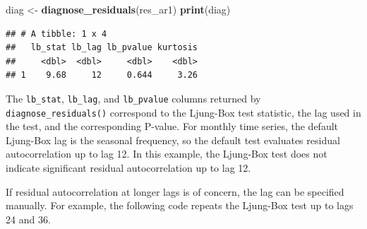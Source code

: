 \documentclass[
]{article}
\newenvironment{Shaded}{\begin{snugshade}}{\end{snugshade}}
\newcommand{\AttributeTok}[1]{\textcolor[rgb]{0.13,0.29,0.53}{#1}}
\newcommand{\DecValTok}[1]{\textcolor[rgb]{0.00,0.00,0.81}{#1}}
\newcommand{\FunctionTok}[1]{\textcolor[rgb]{0.13,0.29,0.53}{\textbf{#1}}}
\newcommand{\NormalTok}[1]{#1}
\newcommand{\OtherTok}[1]{\textcolor[rgb]{0.56,0.35,0.01}{#1}}
\newcommand{\SpecialCharTok}[1]{\textcolor[rgb]{0.81,0.36,0.00}{\textbf{#1}}}
\newcommand{\StringTok}[1]{\textcolor[rgb]{0.31,0.60,0.02}{#1}}
\begin{document}
\begin{Shaded}
\begin{Highlighting}[]
\NormalTok{diag }\OtherTok{\textless{}{-}} \FunctionTok{diagnose\_residuals}\NormalTok{(res\_ar1)}
\FunctionTok{print}\NormalTok{(diag)}
\end{Highlighting}
\end{Shaded}

\begin{verbatim}
## # A tibble: 1 x 4
##   lb_stat lb_lag lb_pvalue kurtosis
##     <dbl>  <dbl>     <dbl>    <dbl>
## 1    9.68     12     0.644     3.26
\end{verbatim}

The \texttt{lb\_stat}, \texttt{lb\_lag}, and \texttt{lb\_pvalue} columns
returned by \texttt{diagnose\_residuals()} correspond to the Ljung-Box
test statistic, the lag used in the test, and the corresponding P-value.
For monthly time series, the default Ljung-Box lag is the seasonal
frequency, so the default test evaluates residual autocorrelation up to
lag 12. In this example, the Ljung-Box test does not indicate
significant residual autocorrelation up to lag 12.

If residual autocorrelation at longer lags is of concern, the lag can be
specified manually. For example, the following code repeats the
Ljung-Box test up to lags 24 and 36.

\begin{Shaded}
\end{Shaded}
\end{document}

